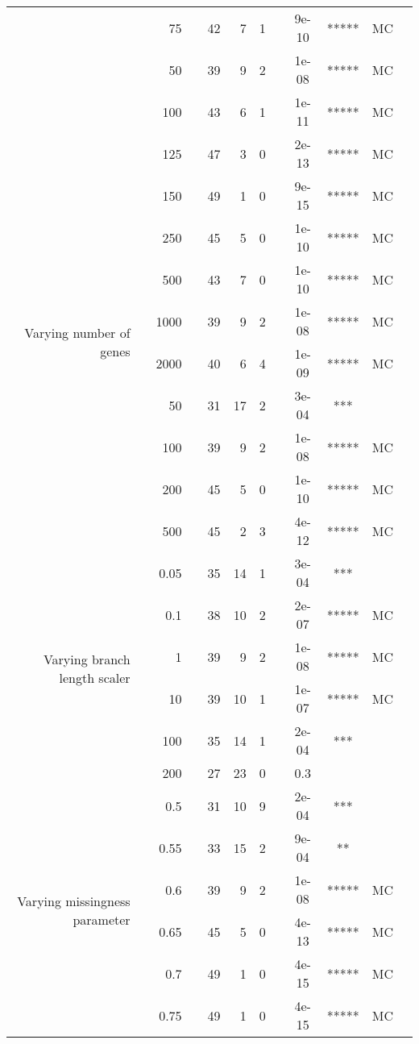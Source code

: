 \begin{table}[!h]
\begin{tabular}{r r r l r r r l c c c l}
   & & 75 & & 42 & 7 & 1 & & 9e-10 & ***** & MC &  \\
   & & 50 & & 39 & 9 & 2 & & 1e-08 & ***** & MC &  \\
   & & 100 & & 43 & 6 & 1 & & 1e-11 & ***** & MC &  \\
   & & 125 & & 47 & 3 & 0 & & 2e-13 & ***** & MC &  \\
   & & 150 & & 49 & 1 & 0 & & 9e-15 & ***** & MC &  \\
\midrule
\multirow{ 6}{2cm}{Varying number of genes}
   & & 250 & & 45 & 5 & 0 & & 1e-10 & ***** & MC &  \\
   & & 500 & & 43 & 7 & 0 & & 1e-10 & ***** & MC &  \\
   & & 1000 & & 39 & 9 & 2 & & 1e-08 & ***** & MC &  \\
   & & 2000 & & 40 & 6 & 4 & & 1e-09 & ***** & MC &  \\
\midrule
\multirow{ 6}{2cm}{Varying sequence length}
   & & 50 & & 31 & 17 & 2 & & 3e-04 & *** &  &  \\
   & & 100 & & 39 & 9 & 2 & & 1e-08 & ***** & MC &  \\
   & & 200 & & 45 & 5 & 0 & & 1e-10 & ***** & MC &  \\
   & & 500 & & 45 & 2 & 3 & & 4e-12 & ***** & MC &  \\
\midrule
\multirow{ 6}{2cm}{Varying branch length scaler}
   & & 0.05 & & 35 & 14 & 1 & & 3e-04 & *** &  &  \\
   & & 0.1 & & 38 & 10 & 2 & & 2e-07 & ***** & MC &  \\
   & & 1 & & 39 & 9 & 2 & & 1e-08 & ***** & MC &  \\
   & & 10 & & 39 & 10 & 1 & & 1e-07 & ***** & MC &  \\
   & & 100 & & 35 & 14 & 1 & & 2e-04 & *** &  &  \\
   & & 200 & & 27 & 23 & 0 & & 0.3 &  &  &  \\
\midrule
\multirow{ 6}{2cm}{Varying missingness parameter}
   & & 0.5 & & 31 & 10 & 9 & & 2e-04 & *** &  &  \\
   & & 0.55 & & 33 & 15 & 2 & & 9e-04 & ** &  &  \\
   & & 0.6 & & 39 & 9 & 2 & & 1e-08 & ***** & MC &  \\
   & & 0.65 & & 45 & 5 & 0 & & 4e-13 & ***** & MC &  \\
   & & 0.7 & & 49 & 1 & 0 & & 4e-15 & ***** & MC &  \\
   & & 0.75 & & 49 & 1 & 0 & & 4e-15 & ***** & MC &  \\
\bottomrule
\end{tabular}
\end{table}